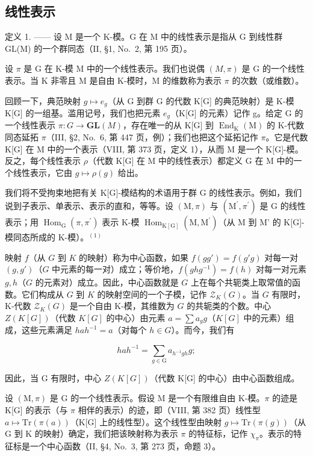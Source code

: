 \subsection{线性表示}

定义 1. —— 设 M 是一个 K-模。G 在 M 中的线性表示是指从 G 到线性群 GL(M) 的一个群同态（II, §1, No.~2, 第 195 页）。

设 \(\pi\) 是 G 在 K-模 M 中的一个线性表示。我们也说偶 \((M,\pi)\) 是 G 的一个线性表示。当 K 非零且 M 是自由 K-模时，M 的维数称为表示 \(\pi\) 的次数（或维数）。

回顾一下，典范映射 \(g \mapsto e_{g}\)（从 G 到群 G 的代数 K{[}G{]} 的典范映射）是 K-模 K{[}G{]} 的一组基。滥用记号，我们也把元素 \(e_{g}\)（K{[}G{]} 的元素）记作 g。给定 G 的一个线性表示 \(\pi : G \to \mathbf{GL}(M)\)，存在唯一的从 K{[}G{]} 到 \(\operatorname{End}_{\mathrm{K}}(\mathrm{M})\) 的 K-代数同态延拓 \(\pi\)（III, §2, No.~6, 第 447 页，例）；我们也把这个延拓记作 \(\pi\)。它是代数 K{[}G{]} 在 M 中的一个表示（VIII, 第 373 页，定义 1），从而 M 是一个 K{[}G{]}-模。反之，每个线性表示 \(\rho\)（代数 K{[}G{]} 在 M 中的线性表示）都定义 G 在 M 中的一个线性表示，它由 \(g \mapsto \rho(g)\) 给出。

我们将不受拘束地把有关 K{[}G{]}-模结构的术语用于群 G 的线性表示。例如，我们说到子表示、单表示、表示的直和，等等。设 \((\mathrm{M},\pi)\) 与 \((\mathrm{M}^{\prime},\pi^{\prime})\) 是 G 的线性表示；用 \(\operatorname{Hom}_{\mathrm{G}}(\pi,\pi^{\prime})\) 表示 K-模 \(\operatorname{Hom}_{\mathrm{K[G]}}(\mathrm{M},\mathrm{M}^{\prime})\)（从 M 到 M' 的 K{[}G{]}-模同态所成的 K-模）。\(^{(1)}\)

映射 \(f\)（从 \(G\) 到 \(K\) 的映射）称为中心函数，如果 \(f(gg') = f(g'g)\) 对每一对 \((g, g')\)（\(G\) 中元素的每一对）成立；等价地，\(f(ghg^{-1}) = f(h)\) 对每一对元素 \(g, h\)（\(G\) 的元素对）成立。因此，中心函数就是 \(G\) 上在每个共轭类上取常值的函数。它们构成从 \(G\) 到 \(K\) 的映射空间的一个子模，记作 \(\mathcal{Z}_K(G)\)。当 \(G\) 有限时，K-代数 \(\mathcal{Z}_K(G)\) 是一个自由 K-模，其维数为 \(G\) 的共轭类的个数。中心 \(Z(K[G])\)（代数 \(K[G]\) 的中心）由元素 \(a = \sum a_g g\)（\(K[G]\) 中的元素）组成，这些元素满足 \(hah^{-1} = a\)（对每个 \(h \in G\)）。而今，我们有

\[
h a h ^ {- 1} = \sum_ {g \in \mathrm{G}} a _ {h ^ {- 1} g h} g;
\]

因此，当 G 有限时，中心 \(Z(K[G])\)（代数 K{[}G{]} 的中心）由中心函数组成。

设 \((\mathrm{M},\pi)\) 是 G 的一个线性表示。假设 M 是一个有限维自由 K-模。\(\pi\) 的迹是 K{[}G{]} 的表示（与 \(\pi\) 相伴的表示）的迹，即（VIII, 第 382 页）线性型 \(a\mapsto\mathrm{Tr}(\pi(a))\)（K{[}G{]} 上的线性型）。这个线性型由映射 \(g\mapsto\mathrm{Tr}(\pi(g))\)（从 G 到 K 的映射）确定，我们把该映射称为表示 \(\pi\) 的特征标，记作 \(\chi_{\pi}\)。表示的特征标是一个中心函数（II, §4, No.~3, 第 273 页，命题 3）。


